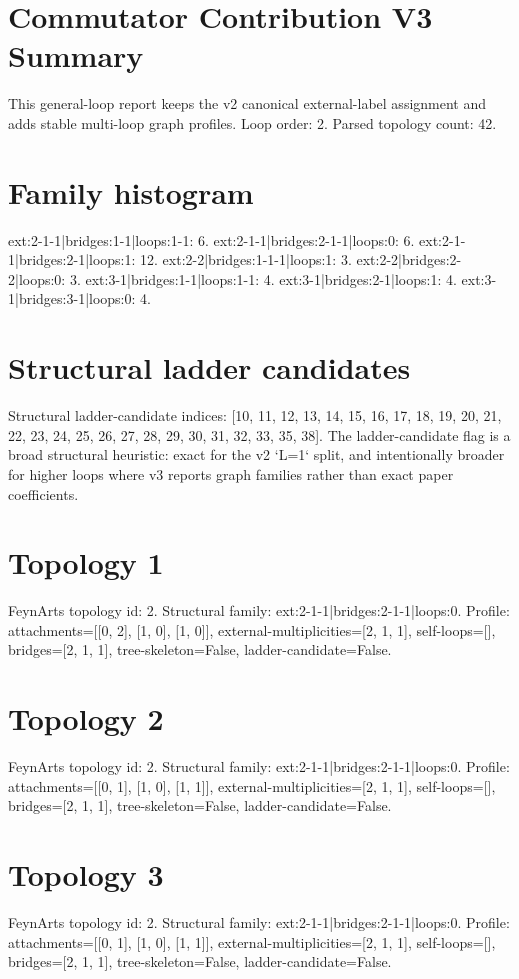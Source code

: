 \documentclass{article}
\begin{document}
\section*{Commutator Contribution V3 Summary}
This general-loop report keeps the v2 canonical external-label assignment and adds stable multi-loop graph profiles.
Loop order: 2.
Parsed topology count: 42.
\section*{Family histogram}
ext:2-1-1|bridges:1-1|loops:1-1: 6.
ext:2-1-1|bridges:2-1-1|loops:0: 6.
ext:2-1-1|bridges:2-1|loops:1: 12.
ext:2-2|bridges:1-1-1|loops:1: 3.
ext:2-2|bridges:2-2|loops:0: 3.
ext:3-1|bridges:1-1|loops:1-1: 4.
ext:3-1|bridges:2-1|loops:1: 4.
ext:3-1|bridges:3-1|loops:0: 4.
\section*{Structural ladder candidates}
Structural ladder-candidate indices: [10, 11, 12, 13, 14, 15, 16, 17, 18, 19, 20, 21, 22, 23, 24, 25, 26, 27, 28, 29, 30, 31, 32, 33, 35, 38].
The ladder-candidate flag is a broad structural heuristic: exact for the v2 `L=1` split, and intentionally broader for higher loops where v3 reports graph families rather than exact paper coefficients.
\section*{Topology 1}
FeynArts topology id: 2.
Structural family: ext:2-1-1|bridges:2-1-1|loops:0.
Profile: attachments=[[0, 2], [1, 0], [1, 0]], external-multiplicities=[2, 1, 1], self-loops=[], bridges=[2, 1, 1], tree-skeleton=False, ladder-candidate=False.
\section*{Topology 2}
FeynArts topology id: 2.
Structural family: ext:2-1-1|bridges:2-1-1|loops:0.
Profile: attachments=[[0, 1], [1, 0], [1, 1]], external-multiplicities=[2, 1, 1], self-loops=[], bridges=[2, 1, 1], tree-skeleton=False, ladder-candidate=False.
\section*{Topology 3}
FeynArts topology id: 2.
Structural family: ext:2-1-1|bridges:2-1-1|loops:0.
Profile: attachments=[[0, 1], [1, 0], [1, 1]], external-multiplicities=[2, 1, 1], self-loops=[], bridges=[2, 1, 1], tree-skeleton=False, ladder-candidate=False.
\end{document}
